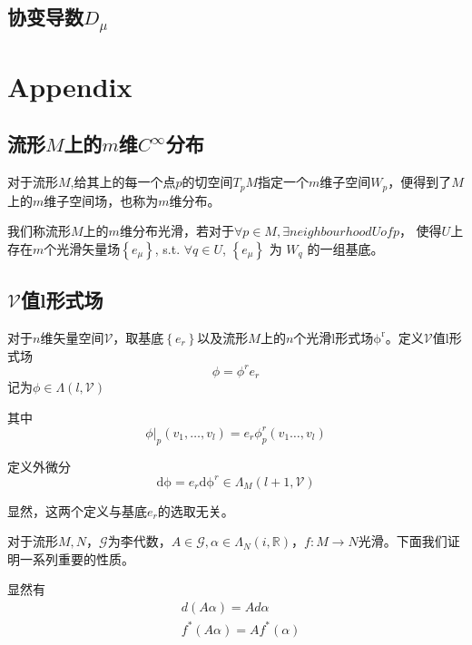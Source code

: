 \documentclass{ctexbook}
\begin{document}
\begin{e   quation}
\chapter{协变导数$D_\mu$}


\part{Appendix}

\chapter{流形$M$上的$m$维$C^{\infty}$分布}

对于流形$M$,给其上的每一个点$p$的切空间$T_p M$指定一个$m$维子空间$W_p$，便得到了$M$上的$m$维子空间场，也称为$m$维分布。

我们称流形$M$上的$m$维分布光滑，若对于$\forall p\in M,\exists neighbourhood U of p$， 使得$U$上存在$m$个光滑矢量场$\left\{e_\mu\right\}$, s.t.
$\forall q\in U$, $\left\{e_\mu\right\}$ 为 $W_q$ 的一组基底。

\chapter{$\mathscr{V}$值$\bm{l}$形式场}

对于$n$维矢量空间$\mathscr{V}$，取基底$\left\{e_{r}\right\}$以及流形$M$上的$n$个光滑$\mathrm{l}$形式场$\mathrm{\phi^{r}}$。定义$\mathscr{V}$值$\mathrm{l}$形式场
\begin{equation}
    \mathscr{\phi}=\mathscr{\phi}^re_r
\end{equation}
记为$\mathscr{\phi}\in\Lambda(l,\mathscr{V})$

其中
\begin{equation}
    \mathscr{\phi}|_p(v_1,\dots,v_l)=e_r\mathscr{\phi}^r_p(v_1\dots,v_l)
\end{equation}

定义外微分
\begin{equation}
    \mathrm{d\phi}=e_r\mathrm{d\phi}^r\in\Lambda_{M}(l+1,\mathscr{V})
\end{equation}

显然，这两个定义与基底$e_r$的选取无关。

对于流形$M,N$，$\mathscr{G}$为李代数，$A\in\mathscr{G},\alpha\in\Lambda_N(i,\mathbb{R})$，$f\colon M\to N$光滑。下面我们证明一系列重要的性质。

显然有
\begin{equation}
    \begin{split}
        &d(A\alpha)=Ad\alpha\\
        &f^{*}(A\alpha)=A f^{*}(\alpha)
    \end{split}
\end{equation}


\end{e   quation}
\end{document}
